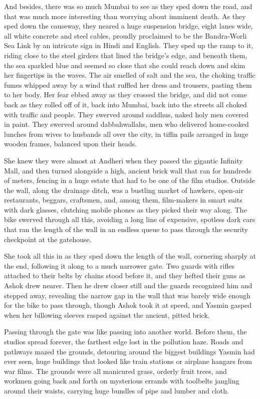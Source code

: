 And besides, there was so much Mumbai to see as they sped down the
road, and that was much more interesting than worrying about
imminent death. As they sped down the causeway, they neared a huge
suspension bridge, eight lanes wide, all white concrete and steel
cables, proudly proclaimed to be the Bandra-Worli Sea Link by an
intricate sign in Hindi and English. They sped up the ramp to it,
riding close to the steel girders that lined the bridge's edge, and
beneath them, the sea sparkled blue and seemed so close that she
could reach down and skim her fingertips in the waves. The air
smelled of salt and the sea, the choking traffic fumes whipped away
by a wind that ruffled her dress and trousers, pasting them to her
body. Her fear ebbed away as they crossed the bridge, and did not
come back as they rolled off of it, back into Mumbai, back into the
streets all choked with traffic and people. They swerved around
saddhus, naked holy men covered in paint. They swerved around
dabbahwallahs, men who delivered home-cooked lunches from wives to
husbands all over the city, in tiffin pails arranged in huge wooden
frames, balanced upon their heads.

She knew they were almost at Andheri when they passed the gigantic
Infinity Mall, and then turned alongside a high, ancient brick wall
that ran for hundreds of meters, fencing in a huge estate that had
to be one of the film studios. Outside the wall, along the drainage
ditch, was a bustling market of hawkers, open-air restaurants,
beggars, craftsmen, and, among them, film-makers in smart suits
with dark glasses, clutching mobile phones as they picked their way
along. The bike swerved through all this, avoiding a long line of
expensive, spotless dark cars that ran the length of the wall in an
endless queue to pass through the security checkpoint at the
gatehouse.

She took all this in as they sped down the length of the wall,
cornering sharply at the end, following it along to a much narrower
gate. Two guards with rifles attached to their belts by chains
stood before it, and they hefted their guns as Ashok drew nearer.
Then he drew closer still and the guards recognized him and stepped
away, revealing the narrow gap in the wall that was barely wide
enough for the bike to pass through, though Ashok took it at speed,
and Yasmin gasped when her billowing sleeves rasped against the
ancient, pitted brick.

Passing through the gate was like passing into another world.
Before them, the studios spread forever, the farthest edge lost in
the pollution haze. Roads and pathways mazed the grounds, detouring
around the biggest buildings Yasmin had ever seen, huge buildings
that looked like train stations or airplane hangars from war films.
The grounds were all manicured grass, orderly fruit trees, and
workmen going back and forth on mysterious errands with toolbelts
jangling around their waists, carrying huge bundles of pipe and
lumber and cloth.

